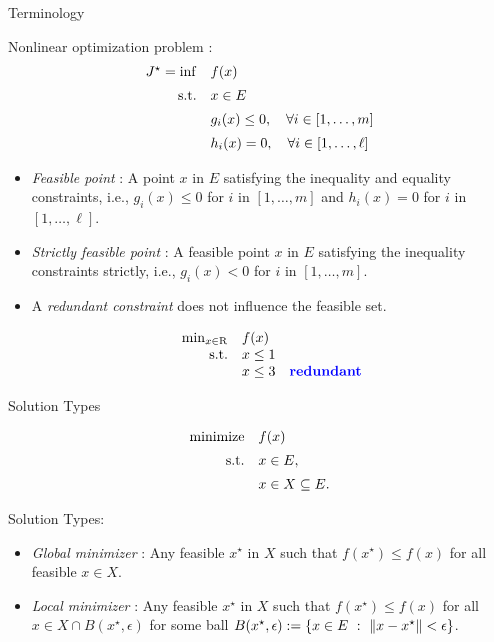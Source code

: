 \documentclass[9pt]{beamer}
\begin{document}
\begin{frame}{Terminology}

  Nonlinear optimization problem :
  \vfill
  \[
  \begin{array}{rl}
    J^\star = \inf & f(x) \\[0.5em]
    \mathrm{s.t.}    & x\in E\\[0.5em]
           & g_i(x) \leq 0, \quad \forall i \in [1, \dots, m]\\[0.5em]
                     & h_i(x) = 0, \quad \forall i \in [1, \dots, \ell]
  \end{array}
  \]
  \vfill
  
  \begin{itemize}
  \item \emph{Feasible point} : A point $x$ in $E$ satisfying the inequality and equality constraints, i.e., $g_i(x)\leq 0$ for $i$ in $[1, \dots, m]$ and $h_i(x)=0$ for $i$ in $[1, \dots, \ell]$.

  \item \emph{Strictly feasible point} : A feasible point $x$ in $E$ satisfying the inequality constraints strictly, i.e., $g_i(x)<0$ for $i$ in $[1, \dots, m]$.

  \item A \emph{redundant constraint} does not influence the feasible set.

    \[
      \begin{array}{rl}
        \min_{x\in\mathrm{R}} & f(x) \\
        \mathrm{s.t.} & x\leq 1 \\
                       & x\leq 3 \quad {\bf {\color{blue} redundant}}
      \end{array}
    \]
  \end{itemize}
  
\end{frame}

\begin{frame}{Solution Types}

  \[
    \begin{array}{rl}
      \operatorname{minimize} & f(x) \\[0.5em]
      \mathrm{s.t.} & x\in E,\\[0.5em]
          & x\in X \subseteq E.
    \end{array}
  \]

  \vfill
    
  Solution Types:
  \begin{itemize}
  \item \emph{Global minimizer} : Any feasible $x^\star$ in $X$ such that $f(x^\star) \leq f(x)$ for all feasible $x\in X$.
    \vspace{0.5em}
  \item \emph{Local minimizer} : Any feasible $x^\star$ in $X$ such that $f(x^\star) \leq f(x)$ for all $x\in X \cap B(x^\star, \epsilon)$ for some ball $B(x^\star, \epsilon) := \left\{ x\in E\ : \ \left\|x-x^\star\right\|<\epsilon \right\}$.
  \end{itemize}
  
\end{frame}
\end{document}
